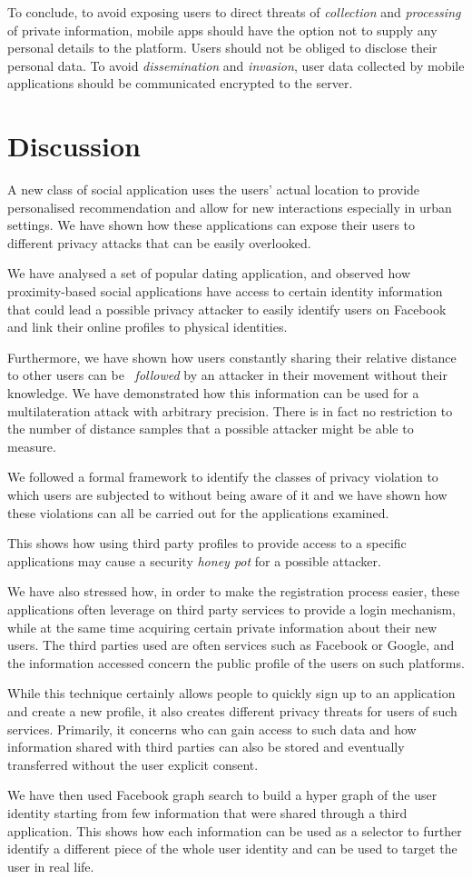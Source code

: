 To conclude, to avoid exposing users to direct threats of \emph{collection} and \emph{processing} of private information, mobile apps should have the option not to supply any personal details to the platform. Users should not be obliged to disclose their personal data. To avoid \emph{dissemination} and \emph{invasion}, user data collected by mobile applications should be communicated encrypted to the server.

\section{Discussion}
\noindent
A new class of social application uses the users' actual location to provide personalised recommendation and allow for new interactions especially in urban settings. We have shown how these applications can expose their users to different privacy attacks that can be easily overlooked.

We have analysed a set of popular dating application, and observed how proximity-based social applications have access to certain identity information that could lead a possible privacy attacker to easily identify users on Facebook and link their online profiles to physical identities.

Furthermore, we have shown how users constantly sharing their relative distance to other users can be ~\emph{followed} by an attacker in their movement without their knowledge. We have demonstrated how this information can be used for a multilateration attack with arbitrary precision. There is in fact no restriction to the number of distance samples that a possible attacker might be able to measure.

We followed a formal framework to identify the classes of privacy violation to which users are subjected to without being aware of it and we have shown how these violations can all be carried out for the applications examined.

This shows how using third party profiles to provide access to a specific applications may cause a security \emph{honey pot} for a possible attacker.

We have also stressed how, in order to make the registration process easier, these applications often leverage on third party services to provide a login mechanism, while at the same time acquiring certain private information about their new users. The third parties used are often services such as Facebook or Google, and the information accessed concern the public profile of the users on such platforms.

While this technique certainly allows people to quickly sign up to an application and create a new profile, it also creates different privacy threats for users of such services. Primarily, it concerns who can gain access to such data and how information shared with third parties can also be stored and eventually transferred without the user explicit consent.

We have then used Facebook graph search to build a hyper graph of the user identity starting from few information that were shared through a third application. This shows how each information can be used as a selector to further identify a different piece of the whole user identity and can be used to target the user in real life.